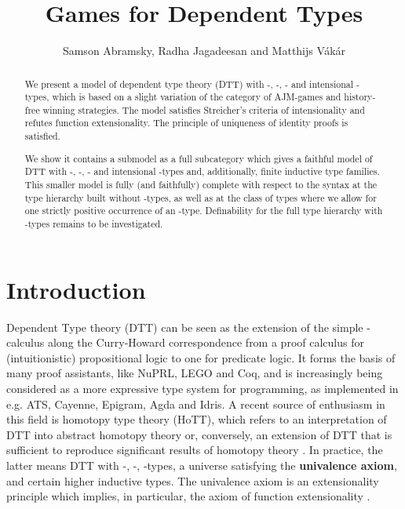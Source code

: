 \documentclass[runningheads,a4paper]{llncs}
\renewcommand{\emph}[1]{\textbf{#1}}
\begin{document}
\mainmatter  

\title{Games for Dependent Types}

\author{Samson Abramsky, Radha Jagadeesan and Matthijs V\'ak\'ar}





\maketitle

\vspace{-20pt}
\begin{abstract}
We present a model of dependent type theory (\textsf{DTT}) with -, -, - and intensional -types, which is based on a slight variation of the category of AJM-games and history-free winning strategies. The model satisfies Streicher's criteria of intensionality and refutes function extensionality. The principle of uniqueness of identity proofs is satisfied.

We show it contains a submodel as a full subcategory which gives a faithful model of \textsf{DTT} with -, -, - and intensional -types and, additionally, finite inductive type families. This smaller model is fully (and faithfully) complete with respect to the syntax   at the type hierarchy built without -types, as well as at the class of types where we allow for one strictly positive occurrence of an -type. Definability for the full type hierarchy with -types remains to be investigated.
\end{abstract}
\vspace{-25pt}
\section{Introduction}
\vspace{-7pt}
Dependent Type theory (\textsf{DTT}) can be seen as the extension of the simple -calculus along the Curry-Howard correspondence from a proof calculus for (intuitionistic) propositional logic to one for predicate logic. It forms the basis of many proof assistants, like NuPRL, LEGO and Coq, and is increasingly being considered as a more expressive type system for programming, as implemented in e.g. ATS, Cayenne, Epigram, Agda and Idris. \cite{altenkirch2005dependent} A recent source of enthusiasm in this field is homotopy type theory (\textsf{HoTT}), which refers to an interpretation of \textsf{DTT} into abstract homotopy theory \cite{awodey2009homotopy} or, conversely, an extension of \textsf{DTT} that is sufficient to reproduce significant results of homotopy theory \cite{hottbook}. In practice, the latter means \textsf{DTT} with -, -, -types, a universe satisfying the \emph{univalence axiom}, and certain higher inductive types. The univalence axiom is an extensionality principle which implies, in particular, the axiom of function extensionality \cite{hottbook}.
\end{document}
